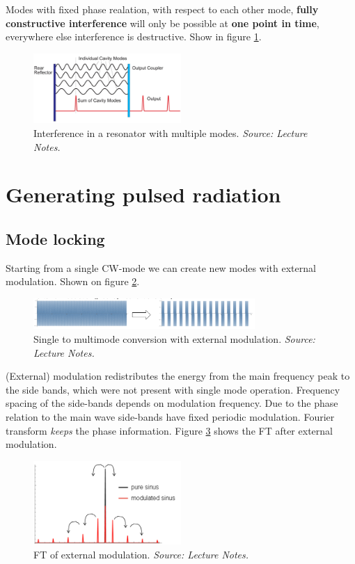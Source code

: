 Modes with fixed phase realation, with respect to each other mode, \textbf{fully constructive interference} will only be possible at \textbf{one point in time}, everywhere else interference is destructive. 
Show in figure \ref{fig:mmif}.
\begin{figure}[h!]
    \centering
    \includegraphics[width=0.5\textwidth]{slike/mmif.png}
    \caption{Interference in a resonator with multiple modes. \textit{Source: Lecture Notes.}}
    \label{fig:mmif}
\end{figure}


\section{Generating pulsed radiation}
\subsection{Mode locking}

Starting from a single CW-mode we can create new modes with external modulation. Shown on figure \ref{fig:em1}.
\begin{figure}[h!]
    \centering
    \includegraphics[width=0.75\textwidth]{slike/em1.png}
    \caption{Single to multimode conversion  with external modulation. \textit{Source: Lecture Notes.}}
    \label{fig:em1}
\end{figure}

(External) modulation redistributes the energy from the main frequency peak to the side bands, which were not present with single mode operation.
Frequency spacing of the side-bands depends on modulation frequency. Due to the phase relation to the main wave side-bands have fixed periodic modulation. 
Fourier transform \textit{keeps} the phase information. Figure \ref{fig:em2} shows the FT after external modulation.

\begin{figure}[h!]
    \centering
    \includegraphics[width=0.5\textwidth]{slike/em2.png}
    \caption{FT of external modulation. \textit{Source: Lecture Notes.}}
    \label{fig:em2}
\end{figure}

